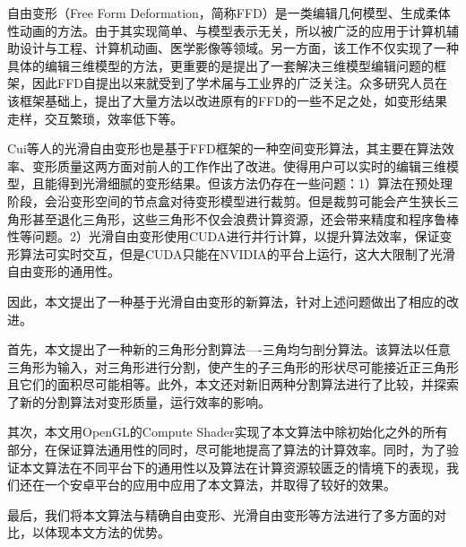 
\begin{cabstract}
    自由变形\cite{Sederberg86}（Free Form Deformation，简称FFD）是一类编辑几何模型、生成柔体性动画的方法。由于其实现简单、与模型表示无关，所以被广泛的应用于计算机辅助设计与工程、计算机动画、医学影像等领域。另一方面，该工作不仅实现了一种具体的编辑三维模型的方法，更重要的是提出了一套解决三维模型编辑问题的框架，因此FFD\cite{Sederberg86}自提出以来就受到了学术届与工业界的广泛关注。众多研究人员在该框架基础上，提出了大量方法以改进原有的FFD的一些不足之处，如变形结果走样，交互繁琐，效率低下等。

    Cui等人的光滑自由变形\cite{Cui15}也是基于FFD框架的一种空间变形算法，其主要在算法效率、变形质量这两方面对前人的工作作出了改进。使得用户可以实时的编辑三维模型，且能得到光滑细腻的变形结果。但该方法仍存在一些问题：1）算法在预处理阶段，会沿变形空间的节点盒对待变形模型进行裁剪。但是裁剪可能会产生狭长三角形甚至退化三角形，这些三角形不仅会浪费计算资源，还会带来精度和程序鲁棒性等问题。2）光滑自由变形使用CUDA进行并行计算，以提升算法效率，保证变形算法可实时交互，但是CUDA只能在NVIDIA的平台上运行，这大大限制了光滑自由变形的通用性。

    因此，本文提出了一种基于光滑自由变形的新算法，针对上述问题做出了相应的改进。

    首先，本文提出了一种新的三角形分割算法----三角均匀剖分算法。该算法以任意三角形为输入，对三角形进行分割，使产生的子三角形的形状尽可能接近正三角形且它们的面积尽可能相等。此外，本文还对新旧两种分割算法进行了比较，并探索了新的分割算法对变形质量，运行效率的影响。

    其次，本文用OpenGL的Compute Shader实现了本文算法中除初始化之外的所有部分，在保证算法通用性的同时，尽可能地提高了算法的计算效率。同时，为了验证本文算法在不同平台下的通用性以及算法在计算资源较匮乏的情境下的表现，我们还在一个安卓平台的应用中应用了本文算法，并取得了较好的效果。

    最后，我们将本文算法与精确自由变形、光滑自由变形等方法进行了多方面的对比，以体现本文方法的优势。
\end{cabstract}


